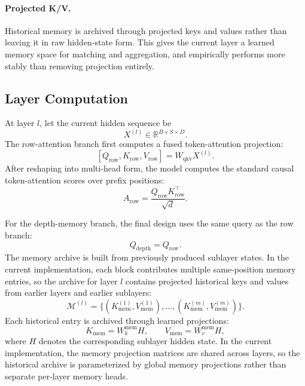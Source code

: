 \documentclass[11pt]{article}
\begin{document}
\paragraph{Projected K/V.}
Historical memory is archived through projected keys and values rather than leaving it in raw hidden-state form. This gives the current layer a learned memory space for matching and aggregation, and empirically performs more stably than removing projection entirely.

\subsection{Layer Computation}

At layer $l$, let the current hidden sequence be
\[
X^{(l)} \in \mathbb{R}^{B \times S \times D}.
\]
The row-attention branch first computes a fused token-attention projection:
\[
[Q_{\text{row}}, K_{\text{row}}, V_{\text{row}}] = W_{\text{qkv}} X^{(l)}.
\]
After reshaping into multi-head form, the model computes the standard causal token-attention scores over prefix positions:
\[
A_{\text{row}} = \frac{Q_{\text{row}} K_{\text{row}}^\top}{\sqrt{d}}.
\]

For the depth-memory branch, the final design uses the same query as the row branch:
\[
Q_{\text{depth}} = Q_{\text{row}}.
\]
The memory archive is built from previously produced sublayer states. In the current implementation, each block contributes multiple same-position memory entries, so the archive for layer $l$ contains projected historical keys and values from earlier layers and earlier sublayers:
\[
\mathcal{M}^{(l)} = \{(K_{\text{mem}}^{(1)}, V_{\text{mem}}^{(1)}), \ldots, (K_{\text{mem}}^{(m)}, V_{\text{mem}}^{(m)})\}.
\]
Each historical entry is archived through learned projections:
\[
K_{\text{mem}} = W_k^{\text{mem}} H,\qquad V_{\text{mem}} = W_v^{\text{mem}} H,
\]
where $H$ denotes the corresponding sublayer hidden state. In the current implementation, the memory projection matrices are shared across layers, so the historical archive is parameterized by global memory projections rather than separate per-layer memory heads.
\end{document}
